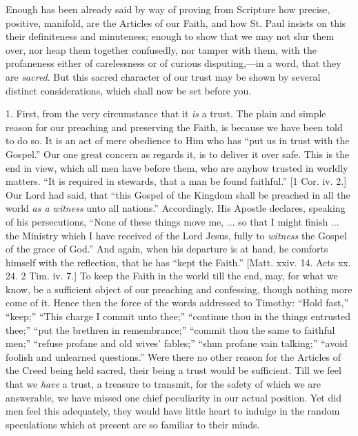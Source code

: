 Enough has been already said by way of proving from Scripture how
precise, positive, manifold, are the Articles of our Faith, and how St.
Paul insists on this their definiteness and minuteness; enough to show
that we may not slur them over, nor heap them together confusedly, nor
tamper with them, with the profaneness either of carelessness or of
curious disputing,—in a word, that they are \emph{sacred}. But this
sacred character of our trust may be shown by several distinct
considerations, which shall now be set before you.

1. First, from the very circumstance that it \emph{is} a trust. The
plain and simple reason for our preaching and preserving the Faith, is
because we have been told to do so. It is an act of mere obedience to
Him who has ``put us in trust with the Gospel.'' Our one great
concern as regards it, is to deliver it over safe. This is the end in
view, which all men have before them, who are anyhow trusted in worldly
matters. ``It is required in stewards, that a man be found
faithful.'' [1 Cor. iv. 2.] Our Lord had said, that ``this
Gospel of the Kingdom shall be preached in all the world \emph{as a witness}
unto all nations.'' Accordingly, His Apostle declares, speaking of
his persecutions, ``None of these things move me, ... so that I
might finish ... the Ministry which I have received of the Lord Jesus,
fully to \emph{witness} the Gospel of the grace of God.'' And again,
when his departure is at hand, he comforts himself with the reflection,
that he has ``kept the Faith.'' [Matt. xxiv. 14. Acts xx. 24. 2
Tim. iv. 7.] To keep the Faith in the world till the end, may, for what
we know, be a sufficient object of our preaching and confessing, though
nothing more come of it. Hence then the force of the words addressed to
Timothy: ``Hold fast,'' ``keep;'' ``This charge I
commit unto thee;'' ``continue thou in the things entrusted
thee;'' ``put the brethren in remembrance;'' ``commit
thou the same to faithful men;'' ``refuse profane and old wives'
fables;'' ``shun profane vain talking;'' ``avoid foolish
and unlearned questions.'' Were there no other reason for the
Articles of the Creed being held sacred, their being a trust would be
sufficient. Till we feel that we \emph{have} a trust, a treasure to
transmit, for the safety of which we are answerable, we have missed one
chief peculiarity in our actual position. Yet did men feel this
adequately, they would have little heart to indulge in the random
speculations which at present are so familiar to their minds.


